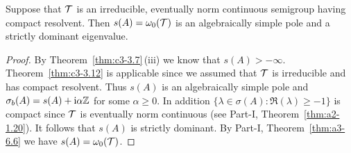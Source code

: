 \begin{corollary}\label{cor:c3-3.17}
	Suppose that $\mathcal{T}$ is an irreducible, eventually norm continuous semigroup having compact resolvent.
	Then $s(A) = \omega_0(\mathcal{T})$ is an algebraically simple pole and a strictly dominant eigenvalue.
\end{corollary}
\begin{proof}
	By Theorem~\ref{thm:c3-3.7}\,(iii) we know that $s(A) > -\infty$. 
	Theorem~\ref{thm:c3-3.12} is applicable since we assumed that $\mathcal{T}$ is irreducible and has compact resolvent.
	Thus $s(A)$ is an algebraically simple pole and $\sigma_{b}(A) = s(A) + \mathrm{i}\alpha\mathbb{Z}$ for some $\alpha \geq 0$. 
	In addition $\{\lambda \in \sigma(A) \colon \Re(\lambda) \geq -1\}$ is compact since $\mathcal{T}$ is eventually norm continuous (see Part-I, Theorem~\ref{thm:a2-1.20}). 
	It follows that $s(A)$ is strictly dominant.
	By Part-I, Theorem~\ref{thm:a3-6.6} we have $s(A) = \omega_0(\mathcal{T})$.
\end{proof}
 
